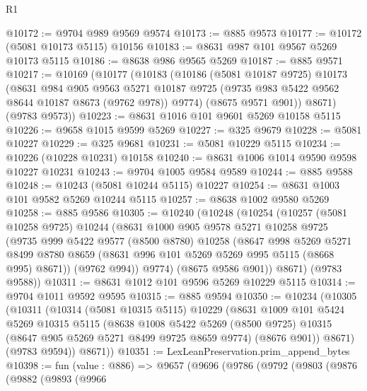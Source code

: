 \begin{lexlean}{R1}
\begin{coremodule}
@10172 := @9704 @989 @9569 @9574
@10173 := @885 @9573
@10177 := @10172 (@5081 @10173 @5115) @10156
@10183 := @8631 @987 @101 @9567 @5269 @10173 @5115
@10186 := @8638 @986 @9565 @5269
@10187 := @885 @9571
@10217 := @10169
    (@10177
      (@10183
        (@10186
          (@5081 @10187 @9725)
          @10173
          (@8631
            @984
            @905
            @9563
            @5271
            @10187
            @9725
            (@9735 @983 @5422 @9562 @8644 @10187 @8673 (@9762 @978))
            @9774)
          (@8675 @9571 @901))
        @8671)
      (@9783 @9573))
@10223 := @8631 @1016 @101 @9601 @5269 @10158 @5115
@10226 := @9658 @1015 @9599 @5269
@10227 := @325 @9679
@10228 := @5081 @10227
@10229 := @325 @9681
@10231 := @5081 @10229 @5115
@10234 := @10226 (@10228 @10231) @10158
@10240 := @8631 @1006 @1014 @9590 @9598 @10227 @10231
@10243 := @9704 @1005 @9584 @9589
@10244 := @885 @9588
@10248 := @10243 (@5081 @10244 @5115) @10227
@10254 := @8631 @1003 @101 @9582 @5269 @10244 @5115
@10257 := @8638 @1002 @9580 @5269
@10258 := @885 @9586
@10305 := @10240
    (@10248
      (@10254
        (@10257
          (@5081 @10258 @9725)
          @10244
          (@8631
            @1000
            @905
            @9578
            @5271
            @10258
            @9725
            (@9735
              @999
              @5422
              @9577
              (@8500 @8780)
              @10258
              (@8647
                @998
                @5269
                @5271
                @8499
                @8780
                @8659
                (@8631 @996 @101 @5269 @5269 @995 @5115 (@8668 @995) @8671))
              (@9762 @994))
            @9774)
          (@8675 @9586 @901))
        @8671)
      (@9783 @9588))
@10311 := @8631 @1012 @101 @9596 @5269 @10229 @5115
@10314 := @9704 @1011 @9592 @9595
@10315 := @885 @9594
@10350 := @10234
    (@10305
      (@10311
        (@10314
          (@5081 @10315 @5115)
          @10229
          (@8631
            @1009
            @101
            @5424
            @5269
            @10315
            @5115
            (@8638
              @1008
              @5422
              @5269
              (@8500 @9725)
              @10315
              (@8647 @905 @5269 @5271 @8499 @9725 @8659 @9774)
              (@8676 @901))
            @8671)
          (@9783 @9594))
        @8671))
@10351 := LexLeanPreservation.prim_append_bytes
@10398 := fun (value : @886) =>
  @9657
    (@9696
      (@9786
        (@9792
          (@9803
            (@9876
              (@9882
                (@9893
                  (@9966

\end{coremodule}
\end{lexlean}
